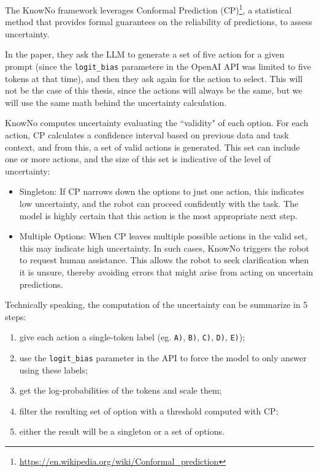 The KnowNo framework leverages Conformal Prediction (CP)\footnote{\url{https://en.wikipedia.org/wiki/Conformal_prediction}},
a statistical method that provides formal guarantees on the reliability of predictions,
to assess uncertainty.

In the paper, they ask the LLM to generate a set of five action for a given prompt
(since the \texttt{logit\_bias} parametere in the OpenAI API was limited to five
tokens at that time), and then they ask again for the action to select. This
will not be the case of this thesis, since the actions will always be the same,
but we will use the same math behind the uncertainty calculation.

KnowNo computes uncertainty evaluating the ``validity" of each option. For each
action, CP calculates a confidence interval based on previous data and task context,
and from this, a set of valid actions is generated. This set can include one or
more actions, and the size of this set is indicative of the level of uncertainty:
\begin{itemize}
  \item Singleton: If CP narrows down the options to just one action, this indicates
    low uncertainty, and the robot can proceed confidently with the task. The model
    is highly certain that this action is the most appropriate next step.

  \item Multiple Options: When CP leaves multiple possible actions in the valid
    set, this may indicate high uncertainty. In such cases, KnowNo triggers the robot
    to request human assistance. This allows the robot to seek clarification
    when it is unsure, thereby avoiding errors that might arise from acting on uncertain
    predictions.
\end{itemize}

Technically speaking, the computation of the uncertainty can be summarize in 5
steps:
\begin{enumerate}
  \item give each action a single-token label (eg. \texttt{A)}, \texttt{B)}, \texttt{C)},
    \texttt{D)}, \texttt{E)});

  \item use the \texttt{logit\_bias} parameter in the API to force the model to
    only answer using these labels;

  \item get the log-probabilities of the tokens and scale them;

  \item filter the resulting set of option with a threshold computed with CP;

  \item either the result will be a singleton or a set of options.
\end{enumerate}

